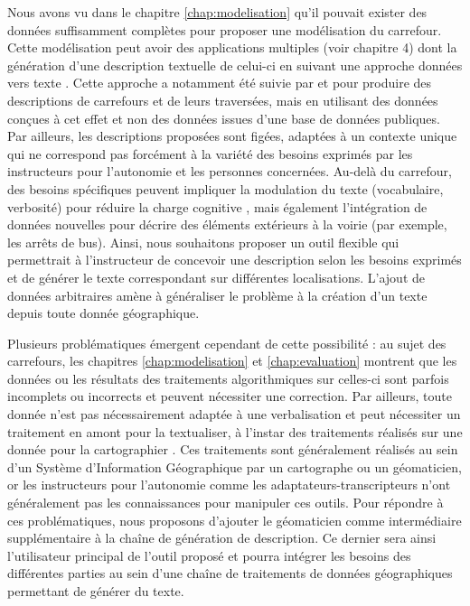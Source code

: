 \label{sec:description_geodata_to_text}

Nous avons vu dans le chapitre \ref{chap:modelisation} qu’il pouvait exister des données suffisamment complètes pour proposer une modélisation du carrefour. Cette modélisation peut avoir des applications multiples (voir chapitre 4) dont la génération d’une description textuelle de celui-ci en suivant une approche données vers texte \cite{reiter-2007-architecture}. Cette approche a notamment été suivie par \missref{} et \missref{} pour produire des descriptions de carrefours et de leurs traversées, mais en utilisant des données conçues à cet effet et non des données issues d’une base de données publiques. Par ailleurs, les descriptions proposées sont figées, adaptées à un contexte unique qui ne correspond pas forcément à la variété des besoins exprimés par les instructeurs pour l’autonomie et les personnes concernées. Au-delà du carrefour, des besoins spécifiques peuvent impliquer la modulation du texte (vocabulaire, verbosité) pour réduire la charge cognitive \missref{}, mais également l’intégration de données nouvelles pour décrire des éléments extérieurs à la voirie (par exemple, les arrêts de bus). Ainsi, nous souhaitons proposer un outil flexible qui permettrait à l’instructeur de concevoir une description selon les besoins exprimés et de générer le texte correspondant sur différentes localisations. L’ajout de données arbitraires amène à généraliser le problème à la création d’un texte depuis toute donnée géographique.

\newpar{}

Plusieurs problématiques émergent cependant de cette possibilité : au sujet des carrefours, les chapitres \ref{chap:modelisation} et \ref{chap:evaluation} montrent que les données ou les résultats des traitements algorithmiques sur celles-ci sont parfois incomplets ou incorrects et peuvent nécessiter une correction. Par ailleurs, toute donnée n’est pas nécessairement adaptée à une verbalisation et peut nécessiter un traitement en amont pour la textualiser, à l’instar des traitements réalisés sur une donnée pour la cartographier \missref{}. Ces traitements sont généralement réalisés au sein d’un Système d’Information Géographique par un cartographe ou un géomaticien, or les instructeurs pour l’autonomie comme les adaptateurs-transcripteurs n’ont généralement pas les connaissances pour manipuler ces outils. Pour répondre à ces problématiques, nous proposons d’ajouter le géomaticien comme intermédiaire supplémentaire à la chaîne de génération de description. Ce dernier sera ainsi l’utilisateur principal de l’outil proposé et pourra intégrer les besoins des différentes parties au sein d’une chaîne de traitements de données géographiques permettant de générer du texte.

